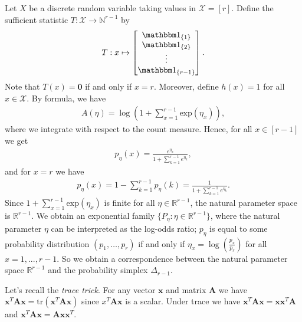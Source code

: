 \begin{eg}
  Let \( X \) be a discrete random variable taking values in \( \mathcal{X} = [r] \). Define the sufficient statistic \( T: \mathcal{X} \to \mathbb N^{r - 1} \) by 
  \begin{align*}
    T: x \mapsto \begin{bmatrix}
      \mathbbm 1_{\left\{ 1 \right\}} \\
      \mathbbm 1_{\left\{ 2 \right\}} \\
      \vdots \\
      \mathbbm 1_{\left\{ r-1 \right\}}      
    \end{bmatrix}.
  \end{align*}
  Note that \( T(x) = \mathbf 0 \) if and only if \( x = r \). Moreover, define \( h(x) = 1 \) for all \( x \in \mathcal{X} \). By formula, we have 
  \begin{align*}
    A(\eta) = \log (1 + \sum_{x=1}^{r-1} \mathrm{exp}\left( \eta_x  \right)),
  \end{align*}
  where we integrate with respect to the count measure. Hence, for all \( x \in [r-1] \) we get 
  \begin{align*}
    p_\eta(x) = \frac{e^{\eta_x}}{1 + \sum^{r -1}_{k=1} e^{\eta_k}},
  \end{align*}
  and for \( x = r \) we have 
  \begin{align*}
    p_\eta(x) = 1 - \sum^{r-1}_{k=1} p_\eta(k) = \frac{1}{1 + \sum^{r-1}_{k=1} e^{\eta_k}}.
  \end{align*}
  Since \( 1 + \sum_{x=1}^{r-1} \mathrm{exp}\left( \eta_x  \right) \) is finite for all \( \eta \in \mathbb R^{r - 1} \), the natural parameter space is \( \mathbb R^{r - 1} \). We obtain an exponential family \( \{P_\eta : \eta \in \mathbb{R}^{r-1}\} \), where the natural parameter \( \eta \) can be interpreted as the log-odds ratio; \( p_\eta \) is equal to some probability distribution \( (p_1, \dots, p_r) \) if and only if \( \eta_x = \log(\frac{p_x}{p_r}) \) for all \( x = 1,..., r-1 \). So we obtain a correspondence between the natural parameter space \( \mathbb{R}^{r-1} \) and the probability simplex \( \Delta_{r-1} \).
\end{eg}

\begin{remark}
  Let's recall the \emph{trace trick}. For any vector \( \mathbf x \) and matrix \( \mathbf A \) we have \( \mathbf x^T \mathbf A \mathbf x = \mathrm{tr}(\mathbf x^T \mathbf A \mathbf x ) \) since \(  x^T \mathbf A \mathbf x \) is a scalar. Under trace we have \( \mathbf x^T \mathbf A \mathbf x = \mathbf x \mathbf x^T \mathbf A \) and \( \mathbf x^T \mathbf A \mathbf x = \mathbf A \mathbf x \mathbf x^T \).
\end{remark}

